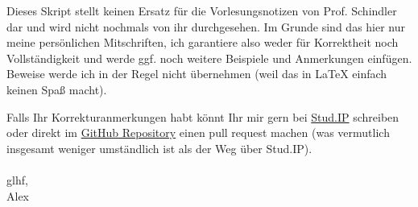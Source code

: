 \documentclass{jvfscript-de}
\newcounter{file}
\begin{document}
\frontmatter
	\maketitle
	\tableofcontents
	\begingroup
	\let\clearpage\relax
	\listoflectures
	\listoffiles
	\endgroup
\newpage
\thispagestyle{plain}

Dieses Skript stellt keinen Ersatz für die Vorlesungsnotizen von Prof. Schindler dar und wird nicht nochmals von ihr durchgesehen. Im Grunde sind das hier nur meine persönlichen Mitschriften, ich garantiere also weder für Korrektheit noch Vollständigkeit und werde ggf. noch weitere Beispiele und Anmerkungen einfügen. Beweise werde ich in der Regel nicht übernehmen (weil das in \LaTeX{} einfach keinen Spaß macht).

Falls Ihr Korrekturanmerkungen habt könnt Ihr mir gern bei \href{https://studip-ecampus.uni-goettingen.de/dispatch.php/profile?username=n.sennewald}{Stud.IP} schreiben oder direkt im \href{https://github.com/vonfalkenstein/Vorlesungsmitschrift-Zahlentheorie}{GitHub Repository} einen pull request machen (was vermutlich insgesamt weniger umständlich ist als der Weg über Stud.IP).\\\\
glhf,\\
Alex


\mainmatter
	
	
	
	
	
	
	
	\pagestyle{plain}
	\printindex
\end{document}

